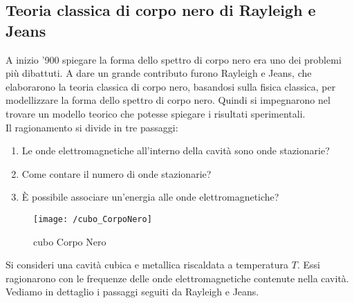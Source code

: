 \subsection{Teoria classica di corpo nero di Rayleigh e Jeans}
A inizio '900 spiegare la forma dello spettro di corpo nero era uno dei problemi più dibattuti.
A dare un grande contributo furono Rayleigh e Jeans, che elaborarono la teoria classica di corpo nero, basandosi sulla fisica classica, per modellizzare la forma dello spettro di corpo nero.
Quindi si impegnarono nel trovare un modello teorico che potesse spiegare i risultati sperimentali. \\
Il ragionamento si divide in tre passaggi:
\begin{enumerate}[label=\Roman{*}.]
\item Le onde elettromagnetiche all'interno della cavità sono onde stazionarie?
\item Come contare il numero di onde stazionarie?
\item È possibile associare un'energia alle onde elettromagnetiche?
\end{enumerate}
\begin{figure}[h]
\centering
\texttt{[image: /cubo\_CorpoNero]}
\caption{cubo Corpo Nero}
\end{figure}
Si consideri una cavità cubica e metallica riscaldata a temperatura $T$.
Essi ragionarono con le frequenze delle onde elettromagnetiche contenute nella cavità.
Vediamo in dettaglio i passaggi seguiti da Rayleigh e Jeans.
